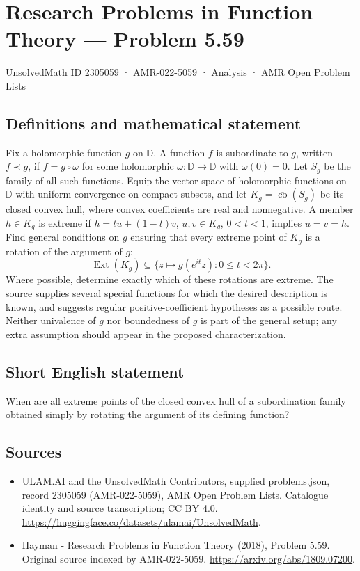 \documentclass[11pt,a4paper]{article}
\begin{document}
\section*{Research Problems in Function Theory — Problem 5.59}\label{2305059}
{\small UnsolvedMath ID 2305059 · AMR-022-5059 · Analysis · AMR Open Problem Lists}
\subsection{Definitions and mathematical statement}
Fix a holomorphic function $g$ on $\mathbb D$. A function $f$ is subordinate to $g$, written $f\prec g$, if $f=g\circ\omega$ for some holomorphic $\omega:\mathbb D\to\mathbb D$ with $\omega(0)=0$. Let $S_g$ be the family of all such functions.
Equip the vector space of holomorphic functions on $\mathbb D$ with uniform convergence on compact subsets, and let
$K_g=\overline{\operatorname{co}}(S_g)$ be its closed convex hull, where convex coefficients are real and nonnegative. A member $h\in K_g$ is extreme if
$h=tu+(1-t)v$, $u,v\in K_g$, $0<t<1$, implies $u=v=h$.
Find general conditions on $g$ ensuring that every extreme point of $K_g$ is a rotation of the argument of $g$:
\[
\operatorname{Ext}(K_g)\subseteq
\{z\mapsto g(e^{it}z):0\le t<2\pi\}.
\]
Where possible, determine exactly which of these rotations are extreme. The source supplies several special functions for which the desired description is known, and suggests regular positive-coefficient hypotheses as a possible route. Neither univalence of $g$ nor boundedness of $g$ is part of the general setup; any extra assumption should appear in the proposed characterization.
\subsection{Short English statement}
When are all extreme points of the closed convex hull of a subordination family obtained simply by rotating the argument of its defining function?
\subsection{Sources}
\begin{itemize}
\item[S1] ULAM.AI and the UnsolvedMath Contributors, supplied problems.json, record 2305059 (AMR-022-5059), AMR Open Problem Lists. Catalogue identity and source transcription; CC BY 4.0.
\url{https://huggingface.co/datasets/ulamai/UnsolvedMath}.
\item[S2] Hayman - Research Problems in Function Theory (2018), Problem 5.59. Original source indexed by AMR-022-5059.
\url{https://arxiv.org/abs/1809.07200}.
\end{itemize}
\end{document}
